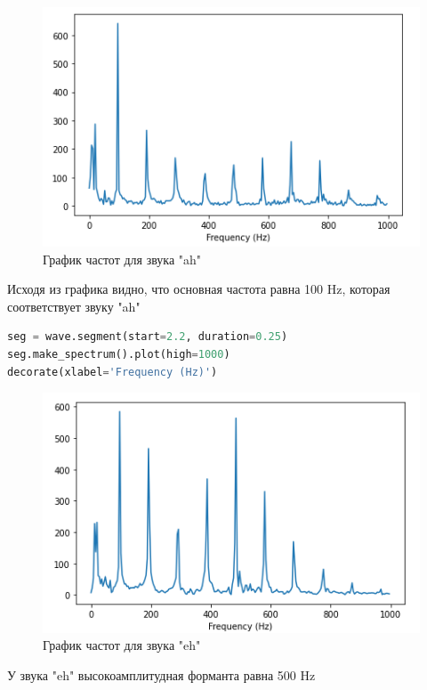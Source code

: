 \begin{figure}[H]
	\begin{center}
		\includegraphics[scale=1]{fig/lab03/lab03_15.png}
		\caption{График частот для звука "ah"}
	\end{center}
\end{figure}

Исходя из графика видно, что основная частота равна 100 Hz, которая соответствует звуку "ah"

\begin{lstlisting}[language=Python]
seg = wave.segment(start=2.2, duration=0.25)
seg.make_spectrum().plot(high=1000)
decorate(xlabel='Frequency (Hz)')
\end{lstlisting}

\begin{figure}[H]
	\begin{center}
		\includegraphics[scale=1]{fig/lab03/lab03_16.png}
		\caption{График частот для звука "eh"}
	\end{center}
\end{figure}

У звука "eh" высокоамплитудная форманта равна 500 Hz

